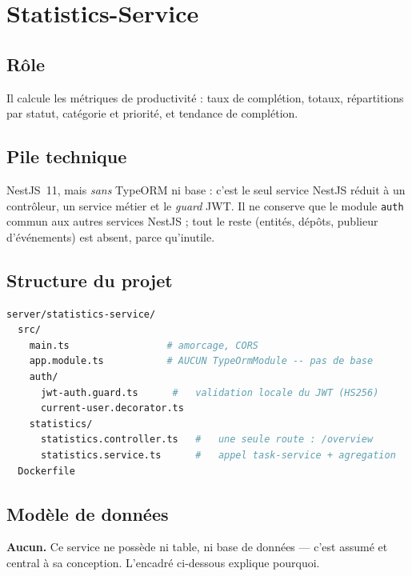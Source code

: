 \documentclass[11pt,a4paper,oneside]{report}
\newcommand{\code}[1]{\texttt{\small #1}}
\begin{document}
\section{Statistics-Service}

\subsection{Rôle}

Il calcule les métriques de productivité : taux de complétion, totaux,
répartitions par statut, catégorie et priorité, et tendance de complétion.

\subsection{Pile technique}

NestJS~11, mais \emph{sans} TypeORM ni base : c'est le seul service NestJS
réduit à un contrôleur, un service métier et le \emph{guard} JWT. Il ne conserve
que le module \code{auth} commun aux autres services NestJS ; tout le reste
(entités, dépôts, publieur d'événements) est absent, parce qu'inutile.

\subsection{Structure du projet}

\begin{lstlisting}[language=bash,numbers=none]
server/statistics-service/
  src/
    main.ts                 # amorcage, CORS
    app.module.ts           # AUCUN TypeOrmModule -- pas de base
    auth/
      jwt-auth.guard.ts      #   validation locale du JWT (HS256)
      current-user.decorator.ts
    statistics/
      statistics.controller.ts   #   une seule route : /overview
      statistics.service.ts      #   appel task-service + agregation
  Dockerfile
\end{lstlisting}

\subsection{Modèle de données}

\textbf{Aucun.} Ce service ne possède ni table, ni base de données — c'est
assumé et central à sa conception. L'encadré ci-dessous explique pourquoi.
\end{document}
